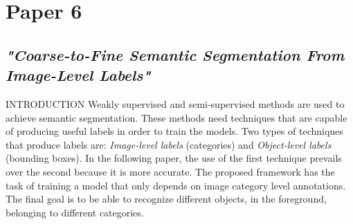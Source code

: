 \section{Paper 6}
\subsection{\emph{"Coarse-to-Fine Semantic Segmentation From Image-Level Labels"}}

\begin{frame}{INTRODUCTION}
    Weakly supervised and semi-supervised methods are used to achieve 
    semantic segmentation. These methods need techniques that are capable 
    of producing useful labels in order to train the models. Two types of 
    techniques that produce labels are: \emph{Image-level labels} (categories) and 
    \emph{Object-level labels} (bounding boxes). In the following paper, the use of 
    the first technique prevails over the second because it is more accurate. 
    The proposed framework has the task of training a model that only 
    depends on image category level annotations. The final goal is to be able 
    to recognize different objects, in the foreground, belonging to different 
    categories.
\end{frame}

